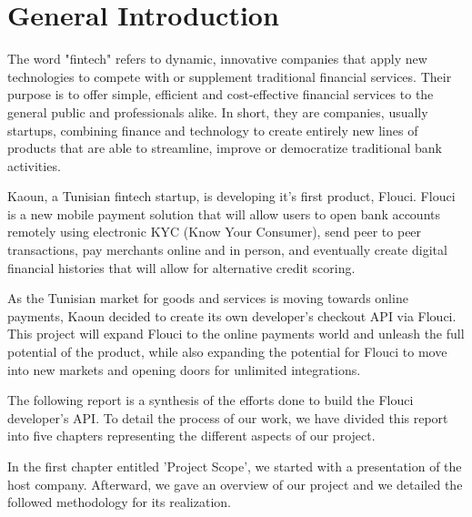 \chapter*{General Introduction}
\graphicspath{{Introduction/figures/}}
\begin{spacing}{1.1}

The word "fintech" refers to dynamic, innovative companies that apply new technologies to compete with or supplement traditional financial services. Their purpose is to offer simple, efficient and cost-effective financial services to the general public and professionals alike. In short, they are companies, usually startups, combining finance and technology to create entirely new lines of products that are able to streamline, improve or democratize traditional bank activities.\newline

Kaoun, a Tunisian fintech startup, is developing it's first product, Flouci. Flouci is a new mobile payment solution that will allow users to open bank accounts remotely using electronic KYC (Know Your Consumer), send peer to peer transactions, pay merchants online and in person, and eventually create digital financial histories that will allow for alternative credit scoring.   \newline


As the Tunisian market for goods and services is moving towards online payments, Kaoun decided to create its own developer's checkout API via Flouci. This project will expand Flouci to the online payments world and unleash the full potential of the product, while also expanding the potential for Flouci to move into new markets and opening doors for unlimited integrations.\newline


The following report is a synthesis of the efforts done to build the Flouci developer's API.
To detail the process of our work, we have divided this report into five chapters representing the different aspects of our project.
\newline

In the first chapter entitled 'Project Scope', we started with a presentation of the host company. Afterward,  we gave an overview of our project and we detailed the followed methodology for its realization.
\newline


\end{spacing}
